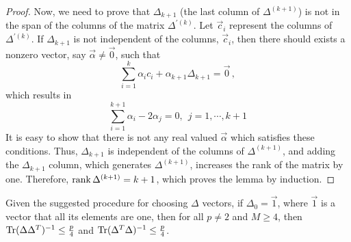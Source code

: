 \begin{proof}
Now, we need to prove that $\Delta_{k+1}$ (the last column of $\Delta^{(k+1)}$) is not in the span of the columns of the matrix $\Delta^{\prime(k)}$. Let $\vec{c}_i$ represent the columns of $\Delta^{\prime(k)}$. If $\Delta_{k+1}$ is not independent of the columns, $\vec{c}_i$, then there should exists a nonzero vector, say $\vec{\alpha}\neq \vec{0}$, such that 
$$ \sum_{i=1}^k \alpha_i c_i + \alpha_{k+1} \Delta_{k+1} = \vec{0}\,,$$
which results in
$$ \sum_{i=1}^{k+1} \alpha_i - 2 \alpha_j= 0, \ \ j=1,\cdots,k+1 $$
It is easy to show that there is not any real valued $\vec{\alpha}$ which satisfies these conditions. Thus, $\Delta_{k+1}$ is independent of the columns of $\Delta^{(k+1)}$, and adding the $\Delta_{k+1}$ column, which generates $\Delta^{(k+1)}$, increases the rank of the matrix by one. Therefore, $\operatorname{rank} \Delta^{(k+1)} = k+1$, which proves the lemma by induction. 
\end{proof}

\begin{lemma} \label{lem_trBound}
Given the suggested procedure for choosing $\Delta$ vectors, if $\Delta_0 = \vec{1}$, where $\vec{1}$ is a vector that all its elements are one, then for all $p\neq 2$ and $M \geq 4$, then $\operatorname{Tr} (\Delta \Delta^T)^{-1} \leq \frac{p}{4}$ and $\operatorname{Tr} (\Delta^T \Delta)^{-1} \leq \frac{p}{4}$.
\end{lemma}

